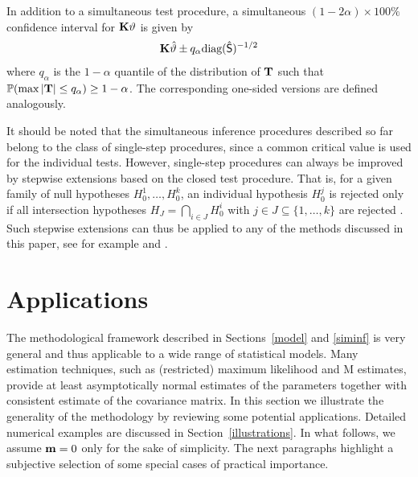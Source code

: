 \documentclass[12pt]{article}
\begin{document}
In addition to a simultaneous test procedure, a simultaneous $(1 - 2\alpha) \times 100\%$
confidence interval for $\mathbf{K} \vartheta$ is given by
\begin{eqnarray*}
\mathbf{K} \hat{\vartheta} \pm q_\alpha \text{diag}(\hat{\textsf{S}})^{-1/2}
\end{eqnarray*}
where $q_\alpha$ is the $1 - \alpha$
quantile of the distribution of $\mathbf{T}$
such that $\mathbb{P}(\max{|\mathbf{T}|} \le q_\alpha) \ge 1 - \alpha$. The corresponding
one-sided versions are defined analogously.


It should be noted that the simultaneous inference procedures described so far
belong to the class of single-step procedures, since a common critical value is
used for the individual tests. However, single-step procedures
can always be improved by stepwise extensions based on the closed test procedure.
That is, for a given family of null
hypotheses $H_0^1, \dots, H_0^k$, an individual hypothesis $H_0^j$ is
rejected only if all intersection hypotheses $H_J = \bigcap_{i \in
J} H_0^i$ with $j \in J \subseteq \{1, \dots, k\}$ are rejected
\citep{Marcusetal1976}.
Such stepwise extensions can thus be applied to any of the methods
discussed in this paper, see for example \cite{Westfall1997} and
\cite{WestfallTobias2007}.

\section{Applications} \label{applications}

The methodological framework described in Sections~\ref{model} and
\ref{siminf} is
very general and thus applicable to a wide range of statistical
models. Many estimation techniques, such as (restricted) maximum
likelihood and M estimates, provide at least asymptotically normal
estimates of the parameters together with consistent estimate of
the covariance matrix. In this section we
illustrate the generality of the methodology by reviewing some
potential applications. Detailed numerical examples are discussed
in Section~\ref{illustrations}. In what follows, we assume $\mathbf{m} =
0$ only for the sake of simplicity.
The next paragraphs highlight a subjective selection of
some special cases of practical importance.
\end{document}
